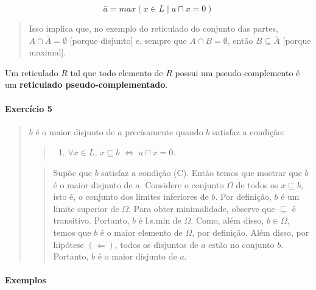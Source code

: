 \[
\bar{a} = max (x \in L  \mid a \sqcap x = 0)
\]

\begin{quote}
Isso implica que, no exemplo do reticulado do conjunto das partes,
\(A \cap \bar{A} = \emptyset\) {[}porque disjunto{]} e, sempre que
\(A \cap B = \emptyset\), então \(B \subseteq \bar{A}\) {[}porque
maximal{]}.
\end{quote}

Um reticulado \(R\) tal que todo elemento de \(R\) possui um
pseudo-complemento é um \textbf{reticulado pseudo-complementado}.

\hypertarget{exercuxedcio-5}{%
\paragraph{Exercício 5}\label{exercuxedcio-5}}

\begin{quote}
\(b\) é o maior disjunto de \(a\) precisamente quando \(b\) satisfaz a
condição:

\begin{quote}
\begin{enumerate}
\def\labelenumi{(\Alph{enumi})}
\setcounter{enumi}{2}
\tightlist
\item
  \(\forall x \in L\), \(x \sqsubseteq b\) \(\Leftrightarrow\)
  \(a \sqcap x = 0\).
\end{enumerate}
\end{quote}

\begin{quote}
Supõe que \(b\) satisfaz a condição (C). Então temos que mostrar que
\(b\) é o maior disjunto de \(a\). Considere o conjunto \(\Omega\) de
todos os \(x \sqsubseteq b\), isto é, o conjunto dos limites inferiores
de \(b\). Por definição, \(b\) é um limite superior de \(\Omega\). Para
obter minimalidade, observe que \(\sqsubseteq\) é transitivo. Portanto,
\(b\) é l.s.min de \(\Omega\). Como, além disso, \(b \in \Omega\), temos
que \(b\) é o maior elemento de \(\Omega\), por definição. Além disso,
por hipótese \((\Leftarrow)\), todos os disjuntos de \(a\) estão no
conjunto \(b\). Portanto, \(b\) é o maior disjunto de \(a\).
\end{quote}
\end{quote}

\hypertarget{exemplos}{%
\paragraph{Exemplos}\label{exemplos}}

